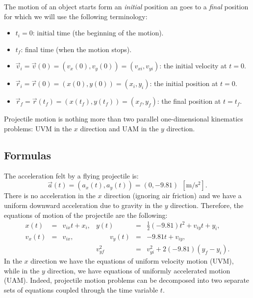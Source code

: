 \documentclass[letterpaper,9pt,journal]{IEEEtran}
\newcommand{\dokuitalic}[1]{\textsl{#1}}
\newcommand{\dokuitem}{\item}
\begin{document}
The motion of an object starts form an \dokuitalic{initial} position an goes to a 
\dokuitalic{final} position for which we will use the following terminology:

\begin{itemize}
\dokuitem  $t_i=0$: initial time (the beginning of the motion).
\dokuitem  $t_f$: final time (when the motion stops).
\dokuitem  $\vec{v}_{i}=\vec{v}(0)=(v_x(0),v_y(0))=(v_{xi},v_{yi})$: the initial velocity at $t=0$.
\dokuitem  $\vec{r}_i=\vec{r}(0)=(x(0),y(0))=(x_i,y_i)$: the initial position at $t=0$.
\dokuitem  $\vec{r}_f=\vec{r}(t_f)=(x(t_f),y(t_f))=(x_f,y_f)$: the final position at $t=t_f$.
\end{itemize}


Projectile motion is nothing more than two parallel one-dimensional 
kinematics problems:  UVM in the $x$ direction and UAM in the $y$ direction.

\vspace{-3mm}
\subsection{Formulas}
\label{51d24e1edefe34e683025dbba5c6eed6}%

The acceleration felt by a flying projectile is:
\[ 
 \vec{a}(t) = %
  (a_x(t),a_y(t)) = (0,-9.81) \ \ [\text{m}/\text{s}^2].
\]
There is no acceleration in the $x$ direction (ignoring air friction) and we have
a uniform downward acceleration due to gravity in the $y$ direction.
Therefore, the equations of motion of the projectile are the following:
\[
\begin{array}{rclrcl}
 x(t)     &\!\!\!\! =\!\!\!\! & v_{ix}t + x_i,  	 & 	y(t) &\!\!\!\!=\!\!\!\!& \frac{1}{2}(-9.81)t^2 + v_{iy}t + y_i, \\
 v_x(t) & \!\!\!\!=\!\!\!\! & v_{ix},		 & 	\qquad v_y(t)  &\!\!\!\!=\!\!\!\!& -9.81 t + v_{iy},  \\
 &&							&	v_{yf}^2 & \!\!\!\!=\!\!\!\! & v_{yi}^2 + 2(-9.81)(y_f - y_i).
\end{array}
\]
In the $x$ direction we have the equations of uniform velocity motion (UVM),
while in the $y$ direction, we have equations of uniformly accelerated motion (UAM).
Indeed, projectile motion problems can be decomposed into two separate sets of equations
coupled through the time variable $t$.

\end{document}
